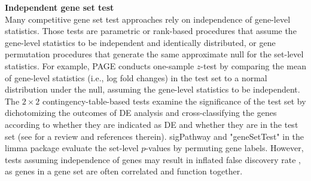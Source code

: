 \documentclass[11pt, a4paper]{article}
\begin{document}
	\textbf{Independent gene set test} \\
	 Many competitive gene set test approaches rely on independence of gene-level statistics. Those tests are parametric or rank-based procedures that assume the gene-level statistics to be independent and identically distributed, or gene permutation procedures that generate the same approximate null for the set-level statistics. For example, PAGE  \citep{kim2005page} conducts one-sample $z$-test by comparing the mean of gene-level statistics (i.e., log fold changes) in the test set to a normal distribution under the null, assuming the  gene-level statistics to be independent. The $2\times 2$ contingency-table-based tests examine the significance of the test set by dichotomizing the outcomes of DE analysis and cross-classifying the genes according to whether they are indicated as DE and whether they are in the test set (see \cite{huang2009bioinformatics} for a review and references therein). sigPathway \citep{tian2005discovering} and "geneSetTest" in the limma package \citep{Smyth2004moderated} evaluate the set-level $p$-values by permuting gene labels. However, tests assuming independence of genes may result in inflated false discovery rate \citep{efron2007testing,goeman2007analyzing, gatti2010heading,wu2012camera,yaari2013quantitative},
	 as genes in a gene set are often correlated and function together.
\end{document}
